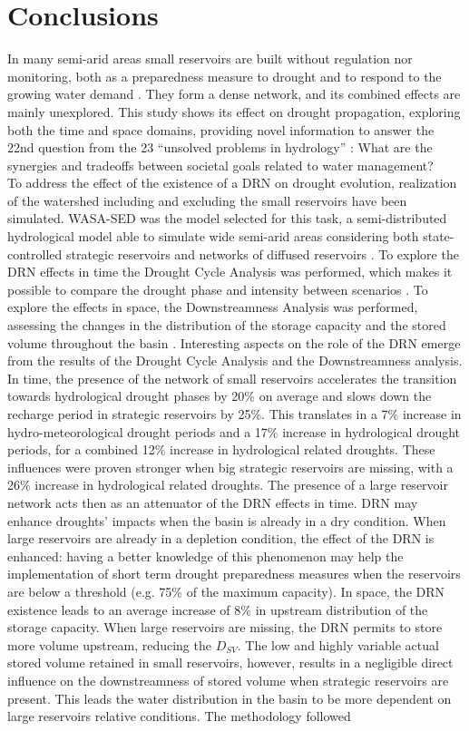 \documentclass[draft]{agujournal2019}
\begin{document}
\section{Conclusions}
In many semi-arid areas small reservoirs are built without regulation nor monitoring, both as a preparedness measure to drought and to respond to the growing water demand \cite{Krol2011,Avisse2017}. They form a dense network, and its combined effects are mainly unexplored. This study shows its effect on drought propagation, exploring both the time and space domains, providing novel information to answer the 22nd question from the 23 “unsolved problems in hydrology” \cite{Bloschl2019}: What are the synergies and tradeoffs between societal goals related to water management?\\
To address the effect of the existence of a DRN on drought evolution, realization of the watershed including and excluding the small reservoirs have been simulated. WASA-SED was the model selected for this task, a semi-distributed hydrological model able to simulate wide semi-arid areas considering both state-controlled strategic reservoirs and networks of diffused reservoirs \cite{Guntner2002,Guntner2004,Mueller2010}. To explore the DRN effects in time the Drought Cycle Analysis was performed, which makes it possible to compare the drought phase and intensity between scenarios \cite{RibeiroNeto2022}. To explore the effects in space, the Downstreamness Analysis was performed, assessing the changes in the distribution of the storage capacity and the stored volume throughout the basin \cite{VanOel2018}. Interesting aspects on the role of the DRN emerge from the results of the Drought Cycle Analysis and the Downstreamness analysis. In time, the presence of the network of small reservoirs accelerates the transition towards hydrological drought phases by 20\% on average and slows down the recharge period in strategic reservoirs by 25\%. This translates in a 7\% increase in hydro-meteorological drought periods and a 17\% increase in hydrological drought periods, for a combined 12\% increase in hydrological related droughts. These influences were proven stronger when big strategic reservoirs are missing, with a 26\% increase in hydrological related droughts. The presence of a large reservoir network acts then as an attenuator of the DRN effects in time. DRN may enhance droughts' impacts when the basin is already in a dry condition. When large reservoirs are already in a depletion condition, the effect of the DRN is enhanced: having a better knowledge of this phenomenon may help the implementation of short term drought preparedness measures when the reservoirs are below a threshold (e.g. 75\% of the maximum capacity). In space, the DRN existence leads to an average increase of 8\% in upstream distribution of the storage capacity. When large reservoirs are missing, the DRN permits to store more volume upstream, reducing the $D_{SV}$. The low and highly variable actual stored volume retained in small reservoirs, however, results in a negligible direct influence on the downstreamness of stored volume when strategic reservoirs are present. This leads the water distribution in the basin to be more dependent on large reservoirs relative conditions. The methodology followed 
\end{document}
